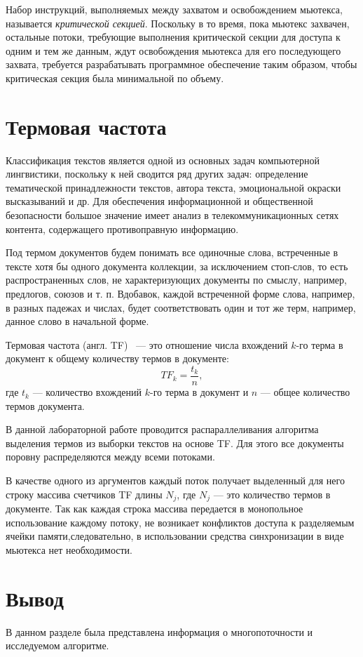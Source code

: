 Набор инструкций, выполняемых между захватом и освобождением мьютекса, называется \textit{критической секцией}. 
Поскольку в то время, пока мьютекс захвачен, остальные потоки, требующие выполнения критической секции для доступа к одним и тем же данным, ждут освобождения мьютекса для его последующего захвата, требуется разрабатывать программное обеспечение таким образом, чтобы критическая секция была минимальной по объему.

\section{Термовая частота}

Классификация текстов является одной из основных задач компьютерной лингвистики, поскольку к ней сводится ряд других задач: определение тематической принадлежности текстов, автора текста, эмоциональной окраски высказываний и др. Для обеспечения информационной и общественной безопасности большое значение имеет анализ в телекоммуникационных сетях контента, содержащего противоправную информацию.~\cite{avto_lingv}

Под термом документов будем понимать все одиночные слова, встреченные в тексте хотя бы одного документа коллекции, за исключением стоп-слов, то есть распространенных слов, не характеризующих документы по смыслу, например, предлогов, союзов и т. п. Вдобавок, каждой встреченной форме слова, например, в разных падежах и числах, будет соответствовать один и тот же терм, например, данное слово в начальной форме.

Термовая частота (англ. TF)~\cite{lingv} --- это отношение числа вхождений $k$-го терма в документ к общему количеству термов в документе:
\begin{equation}
	TF_k = \frac{t_k}{n},
\end{equation}
где $t_k$ --- количество вхождений $k$-го терма в документ и $n$ --- общее количество термов документа.

В данной лабораторной работе проводится распараллеливания алгоритма выделения термов из выборки текстов на основе TF. Для этого все документы поровну распределяются между всеми потоками.

В качестве одного из аргументов каждый поток получает выделенный для него строку массива счетчиков TF длины $N_j$, где $N_j$ — это количество термов в документе. Так как каждая строка массива передается в монопольное использование каждому
потоку, не возникает конфликтов доступа к разделяемым ячейки памяти,следовательно, в использовании средства синхронизации в виде мьютекса нет необходимости.

\section*{Вывод}
В данном разделе была представлена информация о многопоточности и исследуемом алгоритме.